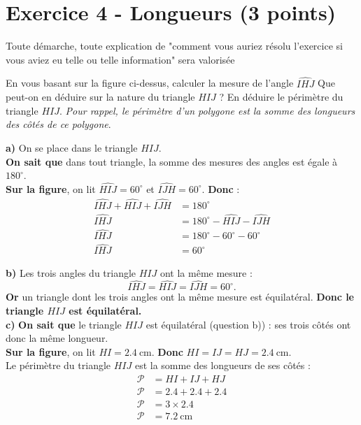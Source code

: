 \documentclass[answers]{exam}
\begin{document}
\pagebreak

\section*{Exercice 4 - Longueurs (3 points)}
\begin{Indication}
Toute démarche, toute explication de "comment vous auriez résolu l'exercice si vous aviez eu telle ou telle information" sera valorisée
\end{Indication}



\begin{questions}
  \question[1] \just En vous basant sur la figure ci-dessus, calculer la mesure de l'angle $\widehat{IHJ}$
  \question[1] \just Que peut-on en déduire sur la nature du triangle $HIJ$ ?
  \question[1] \just En déduire le périmètre du triangle $HIJ$. \textit{Pour rappel, le périmètre d'un polygone est la somme des longueurs des côtés de ce polygone}.
\end{questions}

\begin{solution}
\textbf{a)} On se place dans le triangle $HIJ$. \\

\textbf{On sait que} dans tout triangle, la somme des mesures des angles est égale à $180^\circ$. \\

\textbf{Sur la figure}, on lit $\widehat{HIJ} = 60^\circ$ et $\widehat{IJH} = 60^\circ$. \textbf{Donc} :
\begin{align*}
\widehat{IHJ} + \widehat{HIJ} + \widehat{IJH} &= 180^\circ \\
\widehat{IHJ} &= 180^\circ - \widehat{HIJ} - \widehat{IJH} \\
\widehat{IHJ} &= 180^\circ - 60^\circ - 60^\circ \\
\widehat{IHJ} &= 60^\circ
\end{align*}

\textbf{b)} Les trois angles du triangle $HIJ$ ont la même mesure :
\[
\widehat{IHJ} = \widehat{HIJ} = \widehat{IJH} = 60^\circ.
\]
\textbf{Or} un triangle dont les trois angles ont la même mesure est équilatéral. \textbf{Donc le triangle $HIJ$ est équilatéral.} \\

\textbf{c)} \textbf{On sait que} le triangle $HIJ$ est équilatéral (question b)) : ses trois côtés ont donc la même longueur. \\

\textbf{Sur la figure}, on lit $HI = 2.4~\text{cm}$. \textbf{Donc} $HI = IJ = HJ = 2.4~\text{cm}$. \\

Le périmètre du triangle $HIJ$ est la somme des longueurs de ses côtés :
\begin{align*}
\mathcal{P} &= HI + IJ + HJ \\
\mathcal{P} &= 2.4 + 2.4 + 2.4 \\
\mathcal{P} &= 3 \times 2.4 \\
\mathcal{P} &= 7.2~\text{cm}
\end{align*}
\end{solution}
\end{document}
